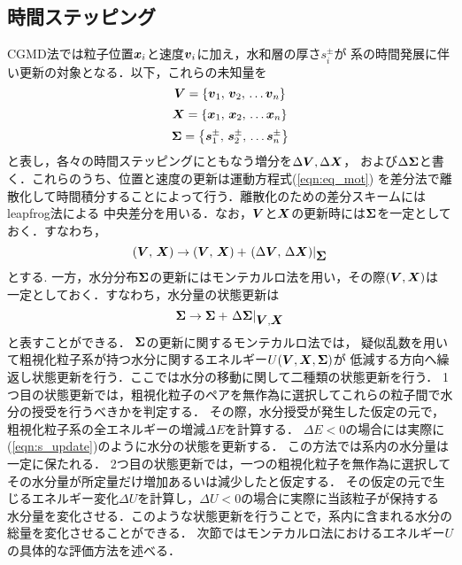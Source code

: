 \subsection{時間ステッピング}
CGMD法では粒子位置$\mbox{\boldmath $x$}_i$と速度$\mbox{\boldmath $v$}_i$に加え，水和層の厚さ$s_i^\pm$が
系の時間発展に伴い更新の対象となる．以下，これらの未知量を
\begin{equation}
	\mbox{\boldmath $V$}=\left\{ \mbox{\boldmath $v$}_1,\, \mbox{\boldmath $v$}_2,\, \dots \mbox{\boldmath $v$}_n \right\}
	\label{eqn:defV}
\end{equation}
\begin{equation}
	\mbox{\boldmath $X$}=\left\{ \mbox{\boldmath $x$}_1,\, \mbox{\boldmath $x$}_2,\, \dots \mbox{\boldmath $x$}_n \right\}
	\label{eqn:defV}
\end{equation}
\begin{equation}
	\mbox{\boldmath $\Sigma$}=\left\{ \mbox{\boldmath $s$}_1^\pm,\, \mbox{\boldmath $s$}_2^\pm,\, \dots \mbox{\boldmath $s$}_n^\pm \right\}
	\label{eqn:defV}
\end{equation}
と表し，各々の時間ステッピングにともなう増分を$\Delta \mbox{\boldmath $V$},\Delta \mbox{\boldmath $X$}$，
および$\Delta \mbox{\boldmath $\Sigma$}$と書く．これらのうち、位置と速度の更新は運動方程式(\ref{eqn:eq_mot})
を差分法で離散化して時間積分することによって行う．離散化のための差分スキームにはleapfrog法による
中央差分を用いる．なお，$\mbox{\boldmath $V$}$と$\mbox{\boldmath $X$}$の更新時には$\mbox{\boldmath $\Sigma$}$を一定としておく．すなわち，
\begin{equation}
	\left( \mbox{\boldmath $V$},\,\mbox{\boldmath $X$} \right)
	\rightarrow 
	\left( \mbox{\boldmath $V$},\,\mbox{\boldmath $X$} \right)
	+
	\left. \left( \Delta \mbox{\boldmath $V$},\, \Delta \mbox{\boldmath $X$} \right) \right|_{\mbox{\boldmath $\Sigma$}}
	\label{eqn:vx_update}
\end{equation}
とする. 一方，水分分布$\mbox{\boldmath $\Sigma$}$の更新にはモンテカルロ法を用い，その際$(\mbox{\boldmath $V$},\mbox{\boldmath $X$})$は
一定としておく．すなわち，水分量の状態更新は
\begin{equation}
	\mbox{\boldmath $\Sigma$} \rightarrow \mbox{\boldmath $\Sigma$} + \left. \Delta \mbox{\boldmath $\Sigma$} \right|_{\mbox{\boldmath $V$},\mbox{\boldmath $X$}}
	\label{eqn:s_update}
\end{equation}
と表すことができる．
$\mbox{\boldmath $\Sigma$}$の更新に関するモンテカルロ法では，
疑似乱数を用いて粗視化粒子系が持つ水分に関するエネルギー$U(\mbox{\boldmath $V$},\mbox{\boldmath $X$},\mbox{\boldmath $\Sigma$})$が
低減する方向へ繰返し状態更新を行う．ここでは水分の移動に関して二種類の状態更新を行う．
1つ目の状態更新では，粗視化粒子のペアを無作為に選択してこれらの粒子間で水分の授受を行うべきかを判定する．
その際，水分授受が発生した仮定の元で，粗視化粒子系の全エネルギーの増減$\Delta E$を計算する．
$\Delta E<0$の場合には実際に(\ref{eqn:s_update})のように水分の状態を更新する．
この方法では系内の水分量は一定に保たれる．
2つ目の状態更新では，一つの粗視化粒子を無作為に選択してその水分量が所定量だけ増加あるいは減少したと仮定する．
その仮定の元で生じるエネルギー変化$\Delta U$を計算し，$\Delta U<0$の場合に実際に当該粒子が保持する
水分量を変化させる．このような状態更新を行うことで，系内に含まれる水分の総量を変化させることができる．
次節ではモンテカルロ法におけるエネルギー$U$の具体的な評価方法を述べる．
